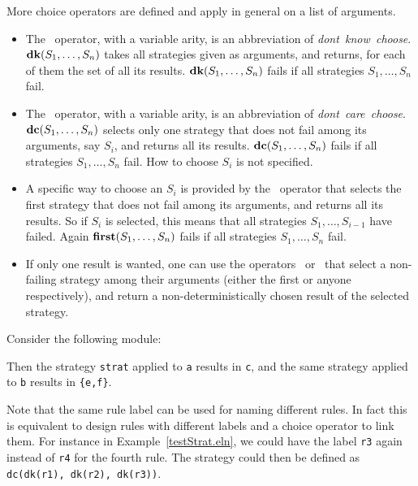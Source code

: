 More choice operators are defined and apply in general on a list of arguments.

\begin{itemize}
\item The \dk\ operator, with a variable arity, is an abbreviation 
of \textit{dont~know~choose}. $\textbf{dk}(S_1,\ldots,S_n)$ takes all strategies 
given as  arguments, and returns, for each of them the set of all its results.
$\textbf{dk}(S_1,\ldots,S_n)$ fails if all strategies $S_1,\ldots,S_n$ fail.

\item The \dc\ operator, with a variable arity, is an abbreviation 
of \textit{dont~care~choose}. $\textbf{dc}(S_1,\ldots,S_n)$ selects only one strategy
that does not fail among its arguments, say $S_i$, and returns all its results.
$\textbf{dc}(S_1,\ldots,S_n)$ fails if all strategies $S_1,\ldots,S_n$ fail.
How to choose $S_i$ is not specified.

\item A specific way to choose an $S_i$ is provided by the \first\
operator that selects the first strategy
that does not fail among its arguments, and returns all its results.
So if $S_i$ is selected,  this means that all strategies
$S_1,\ldots,S_{i-1}$ have failed.
Again $\textbf{first}(S_1,\ldots,S_n)$ fails if all strategies $S_1,\ldots,S_n$ fail.

\item If only one result is wanted, one can use the operators
\firstone\ or  \dcone\  that select a non-failing strategy among 
their arguments (either the first or anyone respectively), and return
a non-deterministically chosen result of the selected strategy.
\end{itemize}


\EX \label{testStrat.eln}
Consider the following module:\\

Then the strategy {\tt strat} applied to {\tt a} results in {\tt c},
and the same strategy applied to {\tt b} results in {\tt \{e,f\}}.

\FEX

Note that the same rule label can be used for naming
different rules. In fact this is equivalent to design rules
with different labels and a choice operator to link them.
For instance in Example~\ref{testStrat.eln}, we could have
the label {\tt r3} again instead of {\tt r4} for the fourth rule.
The strategy could then be defined as
{\tt dc(dk(r1), dk(r2), dk(r3))}.



